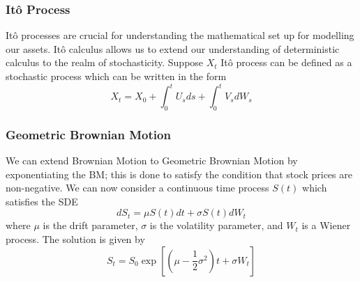\documentclass[12pt]{article}
\numberwithin{equation}{section}
\begin{document}
\subsubsection{It\^{o} Process}
It\^{o} processes are crucial for understanding the mathematical set up for 
modelling our assets. It\^{o} calculus allows us to extend our understanding of 
deterministic calculus to the realm of stochasticity. 
Suppose $X_t$  It\^{o} process can be 
defined as a stochastic process which can be written in the form 
\begin{equation}
  X_t = X_0 + \int^t_0 U_s ds + \int^t_0 V_s dW_s
\end{equation}

\subsubsection{Geometric Brownian Motion}
We can extend Brownian Motion to Geometric Brownian Motion by exponentiating the BM; 
this is done to satisfy the condition that stock prices are non-negative. 
We can now consider a continuous time process $S(t)$ which satisfies the SDE
\begin{equation}
  dS_t = \mu S(t)dt + \sigma S(t)dW_t 
\end{equation}
where $\mu$ is the drift parameter, $\sigma$ is the volatility parameter, and 
$W_t$ is a Wiener process. The solution is given by 
\begin{equation}
  S_t = S_0 \exp \left[(\mu-\frac{1}{2}\sigma^2) t + \sigma W_t\right]
\end{equation}
\end{document}

